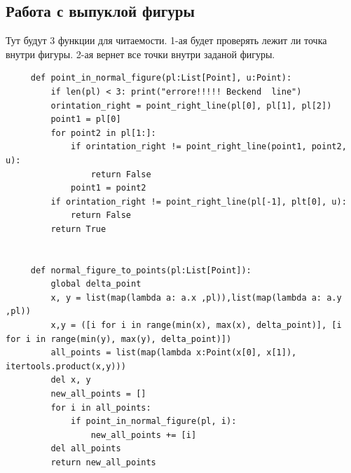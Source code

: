 \documentclass[12pt]{article} %
\begin{document}
 	 \subsection{Работа с выпуклой фигуры}
 	 \hspace*{1cm}Тут будут 3 функции для читаемости. 1-ая будет проверять лежит ли точка внутри фигуры. 2-ая вернет все точки внутри заданой фигуры. 
 	 \begin{verbatim}
 	 def point_in_normal_figure(pl:List[Point], u:Point):
 	     if len(pl) < 3: print("errore!!!!! Beckend  line")
 	     orintation_right = point_right_line(pl[0], pl[1], pl[2])
 	     point1 = pl[0]
 	     for point2 in pl[1:]:
 	         if orintation_right != point_right_line(point1, point2, u):
 	             return False
 	         point1 = point2
 	     if orintation_right != point_right_line(pl[-1], plt[0], u):
 	         return False
 	     return True
 	 
 	 
 	 def normal_figure_to_points(pl:List[Point]):
 	     global delta_point
 	     x, y = list(map(lambda a: a.x ,pl)),list(map(lambda a: a.y ,pl))
 	     x,y = ([i for i in range(min(x), max(x), delta_point)], [i for i in range(min(y), max(y), delta_point)])
 	     all_points = list(map(lambda x:Point(x[0], x[1]), itertools.product(x,y)))
 	     del x, y
 	     new_all_points = []
 	     for i in all_points:
 	         if point_in_normal_figure(pl, i):
 	             new_all_points += [i]
 	     del all_points
 	     return new_all_points
 	 \end{verbatim}
 
\end{document}
